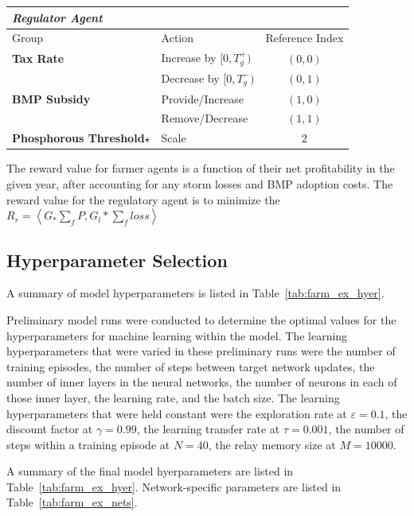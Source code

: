 \begin{table}
\begin{tabularx}{0.9\linewidth}{lXc}
        \emph{Regulator Agent} \\
        \hline
        \hline
        Group & Action & Reference Index \\
        \hline
        \textbf{Tax Rate} & Increase by $[0, T^+_g)$ & $(0, 0)$\\
        & Decrease by $[0, T^-_g)$ & $(0, 1)$ \\
        \textbf{BMP Subsidy} & Provide/Increase & $(1, 0)$ \\
        & Remove/Decrease & $(1, 1)$ \\
        \textbf{Phosphorous Threshold$\star$} & Scale & $2$ \\
        \hline
    \end{tabularx}
\end{table}

The reward value for farmer agents is a function of their net profitability
in the given year, after accounting for any storm losses and BMP adoption
costs.
The reward value for the regulatory agent is to minimize the
$R_r = \left<G_ * \sum_f{P} , G_l * \sum_f{loss}\right>$

\subsection{Hyperparameter Selection}
\label{subsec:farm_ex_hyer}

A summary of model hyperparameters is listed in Table~\ref{tab:farm_ex_hyer}.

Preliminary model runs were conducted to determine the optimal values for
the hyperparameters for machine learning within the model.
The learning hyperparameters that were varied in these preliminary runs were
the number of training episodes,
the number of steps between target network updates,
the number of inner layers in the neural networks,
the number of neurons in each of those inner layer,
the learning rate,
and the batch size.
The learning hyperparameters that were held constant were
the exploration rate at $\varepsilon = 0.1$,
the discount factor at $\gamma = 0.99$,
the learning transfer rate at $\tau = 0.001$,
the number of steps within a training episode at $N = 40$,
the relay memory size at $M = 10000$.

A summary of the final model hyerparameters are listed in
Table~\ref{tab:farm_ex_hyer}.
Network-specific parameters are listed in Table~\ref{tab:farm_ex_nets}.

